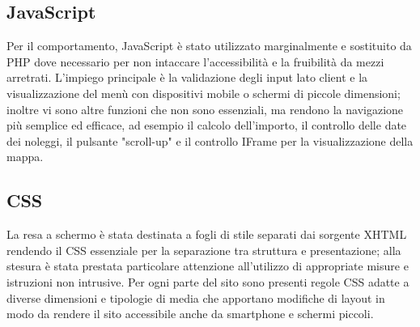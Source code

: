 \subsection{JavaScript}
Per il comportamento, JavaScript è stato utilizzato marginalmente e sostituito da PHP dove necessario per non intaccare l'accessibilità e la fruibilità da mezzi arretrati. L'impiego principale è la validazione degli input lato client e la visualizzazione del menù con dispositivi mobile o schermi di piccole dimensioni;
inoltre vi sono altre funzioni che non sono essenziali, ma rendono la navigazione più semplice ed efficace, ad esempio il calcolo dell'importo, il controllo delle date dei noleggi, il pulsante "scroll-up" e il controllo IFrame per la visualizzazione della mappa.

\subsection{CSS}
La resa a schermo è stata destinata a fogli di stile separati dai sorgente XHTML rendendo il CSS essenziale per la separazione tra struttura e presentazione; alla stesura è stata prestata particolare attenzione all'utilizzo di appropriate misure e istruzioni non intrusive.
Per ogni parte del sito sono presenti regole CSS adatte a diverse dimensioni e tipologie di media che apportano modifiche di layout in modo da rendere il sito accessibile anche da smartphone e schermi piccoli.

\pagebreak
